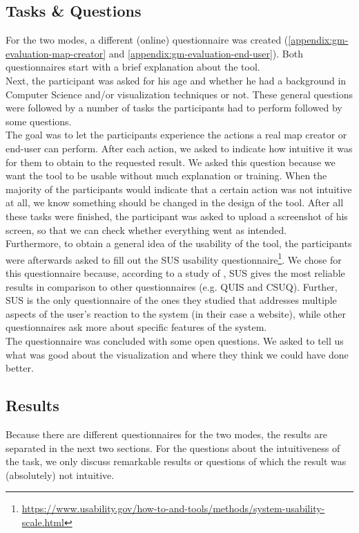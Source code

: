 \subsection{Tasks \& Questions}
For the two modes, a different (online) questionnaire was created (\autoref{appendix:gm-evaluation-map-creator} and \autoref{appendix:gm-evaluation-end-user}). Both questionnaires start with a brief explanation about the tool.\\

Next, the participant was asked for his age and whether he had a background in Computer Science and/or visualization techniques or not. These general questions were followed by a number of tasks the participants had to perform followed by some questions.\\

The goal was to let the participants experience the actions a real map creator or end-user can perform. After each action, we asked to indicate how intuitive it was for them to obtain to the requested result. We asked this question because we want the tool to be usable without much explanation or training. When the majority of the participants would indicate that a certain action was not intuitive at all, we know something should be changed in the design of the tool. After all these tasks were finished, the participant was asked to upload a screenshot of his screen, so that we can check whether everything went as intended.\\

Furthermore, to obtain a general idea of the usability of the tool, the participants were afterwards asked to fill out the SUS usability questionnaire\footnote{\url{https://www.usability.gov/how-to-and-tools/methods/system-usability-scale.html}}. We chose for this questionnaire because, according to a study of \cite{tullis2004comparison}, SUS gives the most reliable results in comparison to other questionnaires (e.g. QUIS and CSUQ). Further, SUS is the only questionnaire of the ones they studied that addresses multiple aspects of the user's reaction to the system (in their case a website), while other questionnaires ask more about specific features of the system.\\

The questionnaire was concluded with some open questions. We asked to tell us what was good about the visualization and where they think we could have done better.

\subsection{Results}
Because there are different questionnaires for the two modes, the results are separated in the next two sections. For the questions about the intuitiveness of the task, we only discuss remarkable results or questions of which the result was (absolutely) not intuitive.

